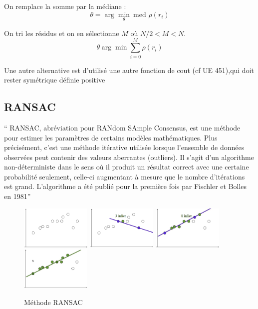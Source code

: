 \documentclass[main.tex]{subfiles}
\begin{document}
\begin{prop}
  On remplace la somme par la médiane :
  \[
    \theta = \arg\min_{\theta}~\text{med } \rho(r_i)
  \]
\end{prop}

\begin{prop}
  On tri les résidus et on en sélectionne $M$ où $N/2 < M< N$.
  \[
    \theta \arg \min \sum_{i=0}^{M}\rho(r_i)
  \]
\end{prop}

Une autre alternative est d'utilisé une autre fonction de cout (cf UE 451),qui doit rester symétrique définie positive

\subsection{RANSAC}
\begin{defin}
``  RANSAC, abréviation pour RANdom SAmple Consensus, est une méthode pour estimer les paramètres de certains modèles mathématiques. Plus précisément, c'est une méthode itérative utilisée lorsque l'ensemble de données observées peut contenir des valeurs aberrantes (outliers). Il s'agit d'un algorithme non-déterministe dans le sens où il produit un résultat correct avec une certaine probabilité seulement, celle-ci augmentant à mesure que le nombre d'itérations est grand. L'algorithme a été publié pour la première fois par Fischler et Bolles en 1981''
\end{defin}

\begin{figure}[H]
  \centering
  \includegraphics[width=0.3\textwidth]{img/ransac_0.png}%
  \includegraphics[width=0.3\textwidth]{img/ransac_1.png}
  \includegraphics[width=0.3\textwidth]{img/ransac_2.png}%
  \includegraphics[width=0.3\textwidth]{img/ransac_3.png}
  \caption{Méthode RANSAC}
\end{figure}
\newpage
\end{document}
